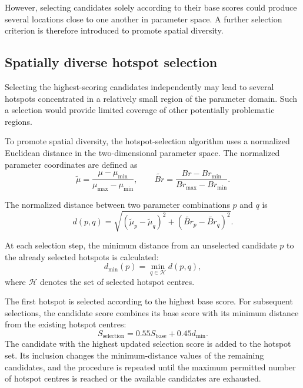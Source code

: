 However, selecting candidates solely according to
their base scores could produce several locations
close to one another in parameter space. A further
selection criterion is therefore introduced to
promote spatial diversity.

\subsection{Spatially diverse hotspot selection}

Selecting the highest-scoring candidates independently
may lead to several hotspots concentrated in a
relatively small region of the parameter domain.
Such a selection would provide limited coverage of
other potentially problematic regions.

To promote spatial diversity, the hotspot-selection
algorithm uses a normalized Euclidean distance in
the two-dimensional parameter space. The normalized
parameter coordinates are defined as
\begin{equation}
    \tilde{\mu}
    =
    \frac{\mu-\mu_{\min}}
    {\mu_{\max}-\mu_{\min}},
    \qquad
    \widetilde{Br}
    =
    \frac{Br-Br_{\min}}
    {Br_{\max}-Br_{\min}}.
    \label{eq:normalized_parameter_coordinates}
\end{equation}

The normalized distance between two parameter
combinations $p$ and $q$ is
\begin{equation}
    d(p,q)
    =
    \sqrt{
    (\tilde{\mu}_p-\tilde{\mu}_q)^2
    +
    (\widetilde{Br}_p-\widetilde{Br}_q)^2
    }.
    \label{eq:normalized_parameter_distance}
\end{equation}

At each selection step, the minimum distance from
an unselected candidate $p$ to the already selected
hotspots is calculated:
\begin{equation}
    \boxed{
    d_{\min}(p)
    =
    \min_{q\in\mathcal{H}}d(p,q),
    }
    \label{eq:minimum_hotspot_distance}
\end{equation}
where $\mathcal{H}$ denotes the set of selected
hotspot centres.

The first hotspot is selected according to the
highest base score. For subsequent selections, the
candidate score combines its base score with its
minimum distance from the existing hotspot centres:
\begin{equation}
    \boxed{
    S_{\mathrm{selection}}
    =
    0.55S_{\mathrm{base}}
    +
    0.45d_{\min}.
    }
    \label{eq:hotspot_selection_score}
\end{equation}
The candidate with the highest updated selection
score is added to the hotspot set. Its inclusion
changes the minimum-distance values of the remaining
candidates, and the procedure is repeated until the
maximum permitted number of hotspot centres is
reached or the available candidates are exhausted.

